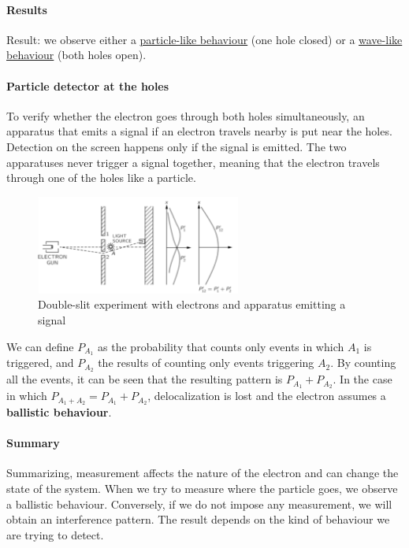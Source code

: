       \paragraph{Results}
      Result: we observe either a \underline{particle-like behaviour} (one hole closed) or a \underline{wave-like behaviour} (both holes open).

      \paragraph{Particle detector at the holes}
      To verify whether the electron goes through both holes simultaneously, an apparatus that emits a signal if an electron travels nearby is put near the holes.
      Detection on the screen happens only if the signal is emitted.
      The two apparatuses never trigger a signal together, meaning that the electron travels through one of the holes like a particle.

      \begin{figure}[h!]
        \centering
        \includegraphics[clip, width=0.6\textwidth]{ele_bal_ds.png}
        \caption{\label{fig:ele_bal_ds} Double-slit experiment with electrons and apparatus emitting a signal}
      \end{figure}

      We can define $P_{A_1}$ as the probability that counts only events in which $A_1$ is triggered, and $P_{A_2}$ the results of counting only events triggering $A_2$.
      By counting all the events, it can be seen that the resulting pattern is $P_{A_1}+P_{A_2}$.
      In the case in which $P_{A_1+A_2} = P_{A_1} + P_{A_2}$, delocalization is lost and the electron assumes a \textbf{ballistic behaviour}.

      \paragraph{Summary}
      Summarizing, measurement affects the nature of the electron and can change the state of the system.
      When we try to measure where the particle goes, we observe a ballistic behaviour.
      Conversely, if we do not impose any measurement, we will obtain an interference pattern.
      The result depends on the kind of behaviour we are trying to detect.

